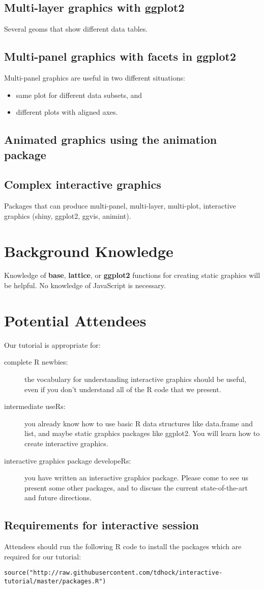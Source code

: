 \documentclass[11pt]{article}
\begin{document}
\subsection*{Multi-layer graphics with ggplot2}
Several geoms that show different data tables.

\subsection*{Multi-panel graphics with facets in ggplot2}
Multi-panel graphics are useful in two different situations:
\begin{itemize}
\item same plot for different data subsets, and
\item different plots with aligned axes.
\end{itemize}

\subsection*{Animated graphics using the animation package}

\subsection*{Complex interactive graphics}
Packages that can produce multi-panel, multi-layer, multi-plot,
interactive graphics (shiny, ggplot2, ggvis, animint).

\section*{Background Knowledge}

Knowledge of \textbf{base}, \textbf{lattice}, or \textbf{ggplot2}
functions for creating static graphics will be helpful. No
knowledge of JavaScript is necessary.

\section*{Potential Attendees}
\label{sec:orgheadline12}
Our tutorial is appropriate for:
\begin{description}
\item[complete R newbies:] the vocabulary for understanding interactive
graphics should be useful, even if you don't understand all of the R
code that we present.
\item[intermediate useRs:] you already know how to use basic R data
  structures like data.frame and list, and maybe static graphics
  packages like ggplot2. You will learn how to create interactive
  graphics.
\item[interactive graphics package developeRs:] you have written an
  interactive graphics package. Please come to see us present some
  other packages, and to discuss the current state-of-the-art and
  future directions.
\end{description}

\subsection*{Requirements for interactive session}

Attendees should run the following R code to install the packages
which are required for our tutorial:

\begin{verbatim}
source("http://raw.githubusercontent.com/tdhock/interactive-tutorial/master/packages.R")
\end{verbatim}
\end{document}
